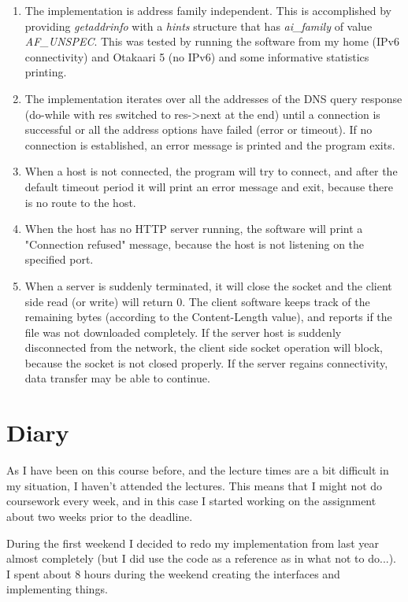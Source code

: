\documentclass[a4paper,12pt]{article}
\begin{document}
\begin{enumerate}
\item The implementation is address family independent. This is accomplished by providing \emph{getaddrinfo} with a \emph{hints} structure that has \emph{ai\_family} of value \emph{AF\_UNSPEC}. This was tested by running the software from my home (IPv6 connectivity) and Otakaari 5 (no IPv6) and some informative statistics printing.
\item The implementation iterates over all the addresses of the DNS query response (do-while with res switched to res->next at the end) until a connection is successful or all the address options have failed (error or timeout). If no connection is established, an error message is printed and the program exits.
\item When a host is not connected, the program will try to connect, and after the default timeout period it will print an error message and exit, because there is no route to the host.
\item When the host has no HTTP server running, the software will print a "Connection refused" message, because the host is not listening on the specified port.
\item When a server is suddenly terminated, it will close the socket and the client side read (or write) will return 0. The client software keeps track of the remaining bytes (according to the Content-Length value), and reports if the file was not downloaded completely. If the server host is suddenly disconnected from the network, the client side socket operation will block, because the socket is not closed properly. If the server regains connectivity, data transfer may be able to continue.
\end{enumerate}

\section{Diary}

As I have been on this course before, and the lecture times are a bit difficult in my situation, I haven't attended the lectures. This means that I might not do coursework every week, and in this case I started working on the assignment about two weeks prior to the deadline.

During the first weekend I decided to redo my implementation from last year almost completely (but I did use the code as a reference as in what not to do...). I spent about 8 hours during the weekend creating the interfaces and implementing things.
\end{document}
